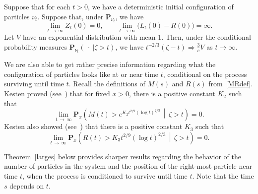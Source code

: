 \documentclass[AHL,Unicode,longabstracts,published]{cedram}
\renewcommand*\P{\mathbf{P}}
\newcommand{\1} {\mathds{1}}
\begin{document}
\begin{prop}\label{extinctiondist}
Suppose that for each $t > 0$, we have a deterministic initial configuration of particles $\nu_t$. Suppose that, under $\P_{\nu_t}$, we have
\begin{equation}\label{maininitial}
\lim_{t\,\rightarrow\,\infty} Z_t(0) = 0, \qquad\lim_{t\,\rightarrow\,\infty} \big(L_t(0) - R(0)\big) = \infty.
\end{equation}
Let $V$ have an exponential distribution with mean 1. Then, under the conditional probability measures $\P_{\nu_t}(\: \cdot \:| \zeta > t)$, we have $t^{-2/3}(\zeta - t) \Rightarrow \frac{3}{c} V$ as $t \rightarrow \infty$.
\end{prop}

We are also able to get rather precise information regarding what the configuration of particles looks like at or near time $t$, conditional on the process surviving until time $t$. Recall the definitions of $M(s)$ and $R(s)$ from~\eqref{MRdef}. Kesten proved (see~\cite[(1.12)]{kesten}) that for fixed $x > 0$, there is a positive constant $K_2$ such that
\begin{equation}\label{KestenM}
\lim_{t\,\rightarrow\,\infty} \P_x\left(M(t) > e^{K_2 t^{2/9} (\log t)^{2/3}} \, \middle| \, \zeta > t\right) = 0.
\end{equation}
Kesten also showed (see~\cite[(1.11)]{kesten}) that there is a positive constant $K_3$ such that
\begin{equation}\label{KestenR}
\lim_{t\,\rightarrow\,\infty} \P_x\left(R(t) > K_3 t^{2/9} (\log t)^{2/3} \,\middle| \, \zeta > t\right) = 0.
\end{equation}

Theorem~\ref{larges} below provides sharper results regarding the behavior of the number of particles in the system and the position of the right-most particle near time $t$, when the process is conditioned to survive until time $t$. Note that the time $s$ depends on $t$.
\end{document}
